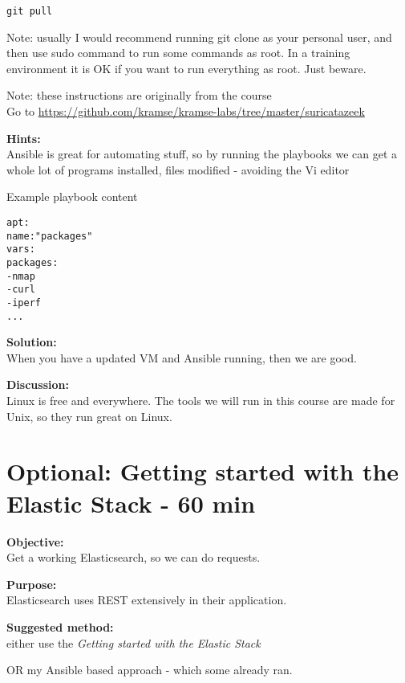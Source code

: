 \documentclass[a4paper,11pt,notitlepage]{report}
\begin{document}
\begin{verbatim}
git pull
\end{verbatim}

Note: usually I would recommend running git clone as your personal user, and then use sudo command to run some commands as root. In a training environment it is OK if you want to run everything as root. Just beware.

Note: these instructions are originally from the course\\
Go to \url{https://github.com/kramse/kramse-labs/tree/master/suricatazeek}

{\bf Hints:}\\
Ansible is great for automating stuff, so by running the playbooks we can get a whole lot of programs installed, files modified - avoiding the Vi editor \smiley

Example playbook content
\begin{alltt}
apt:
      name: "{{ packages }}"
    vars:
      packages:
        - nmap
        - curl
        - iperf
        ...
\end{alltt}

{\bf Solution:}\\
When you have a updated VM and Ansible running, then we are good.

{\bf Discussion:}\\
Linux is free and everywhere. The tools we will run in this course are made for Unix, so they run great on Linux.



\chapter{Optional: Getting started with the Elastic Stack - 60 min}
\label{ex:dateformats}


{\bf Objective:}\\
Get a working Elasticsearch, so we can do requests.

{\bf Purpose:}\\
Elasticsearch uses REST extensively in their application.

{\bf Suggested method:}\\
either use the
\emph{Getting started with the Elastic Stack}

OR my Ansible based approach - which some already ran.
\end{document}
